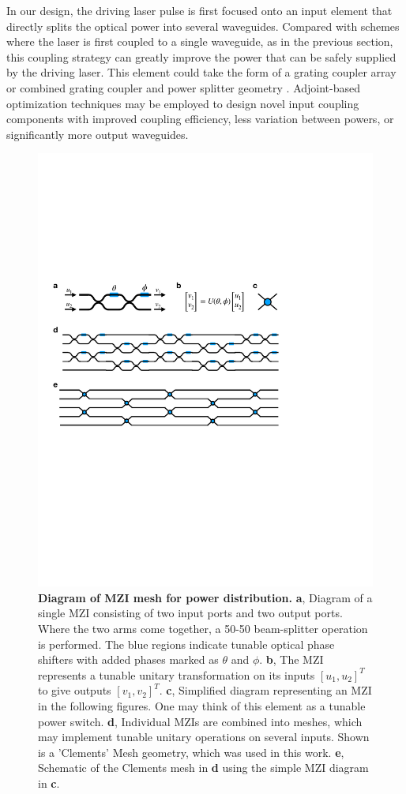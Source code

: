 In our design, the driving laser pulse is first focused onto an input element that directly splits the optical power into several waveguides.  Compared with schemes where the laser is first coupled to a single waveguide, as in the previous section, this coupling strategy can greatly improve the power that can be safely supplied by the driving laser. This element could take the form of a grating coupler array or combined grating coupler and power splitter geometry \cite{spuesens_grating_2016}.  Adjoint-based optimization techniques \cite{sapra2019inverse} may be employed to design novel input coupling components with improved coupling efficiency, less variation between powers, or significantly more output waveguides.

\begin{figure}
\includegraphics[width=1\columnwidth]{figures/MZI_MZI}
\caption{\label{fig:mesh} \textbf{Diagram of MZI mesh for power distribution.} \textbf{a}, Diagram of a single MZI consisting of two input ports and two output ports.  Where the two arms come together, a 50-50 beam-splitter operation is performed.  The blue regions indicate tunable optical phase shifters with added phases marked as $\theta$ and $\phi$.  \textbf{b}, The MZI represents a tunable unitary transformation on its inputs $[u_1, u_2]^T$ to give outputs $[v_1, v_2]^T$.  \textbf{c}, Simplified diagram representing an MZI in the following figures.  One may think of this element as a tunable power switch. \textbf{d}, Individual MZIs are combined into meshes, which may implement tunable unitary operations on several inputs.  Shown is a 'Clements' Mesh geometry, which was used in this work. \textbf{e}, Schematic of the Clements mesh in \textbf{d} using the simple MZI diagram in \textbf{c}.}

\end{figure}
